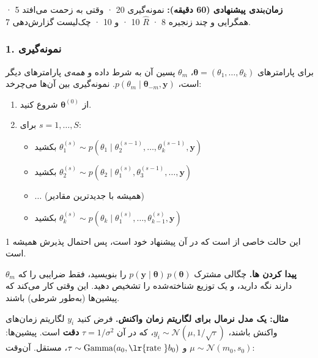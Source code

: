 \textbf{زمان‌بندی پیشنهادی (60 دقیقه):} نمونه‌گیری  20 · وقتی
 به زحمت می‌افتد 5 · همگرایی و چند زنجیره 8 · \(\hat R\) 10 ·
 و  10 · چک‌لیست گزارش‌دهی 7.

\subsubsection{\texorpdfstring{1. نمونه‌گیری
}{1. نمونه‌گیری Gibbs}}

برای پارامترهای \(\boldsymbol\theta = (\theta_1,\allowbreak \dots,\allowbreak \theta_k)\)،
\textbf{} \(\theta_m\) پسین آن به شرط داده و
\emph{همه‌ی} پارامترهای دیگر است،
\(p(\theta_m \mid \boldsymbol\theta_{-m},\allowbreak \mathbf{y})\). نمونه‌گیری
 بین آن‌ها می‌چرخد:

\begin{enumerate}
\def\labelenumi{\arabic{enumi}.}
\tightlist
\item
  از \(\boldsymbol\theta^{(0)}\) شروع کنید.
\item
  برای \(s = 1, \dots, S\):

  \begin{itemize}
  \tightlist
  \item
    بکشید
    \(\theta_1^{(s)} \sim p(\theta_1 \mid \theta_2^{(s-1)},\allowbreak \dots,\allowbreak \theta_k^{(s-1)},\allowbreak \mathbf{y})\)
  \item
    بکشید
    \(\theta_2^{(s)} \sim p(\theta_2 \mid \theta_1^{(s)},\allowbreak \theta_3^{(s-1)},\allowbreak \dots,\allowbreak \mathbf{y})\)
  \item
    \ensuremath{\ldots} (همیشه با جدیدترین مقادیر)
  \item
    بکشید
    \(\theta_k^{(s)} \sim p(\theta_k \mid \theta_1^{(s)},\allowbreak \dots,\allowbreak \theta_{k-1}^{(s)},\allowbreak \mathbf{y})\)
  \end{itemize}
\end{enumerate}

این حالت خاصی از  است که در آن پیشنهاد خود
 است، پس احتمال پذیرش همیشه 1 است.

\textbf{پیدا کردن ها.} چگالی مشترک
\(p(\mathbf{y}\mid\boldsymbol\theta)\,p(\boldsymbol\theta)\) را بنویسید،
فقط ضرایبی را که \(\theta_m\) دارند نگه دارید، و یک توزیع شناخته‌شده را
تشخیص دهید. این وقتی کار می‌کند که پیشین‌ها (به‌طور شرطی)
\textbf{} باشند.

\textbf{مثال: یک مدل نرمال برای لگاریتم زمان واکنش.} فرض کنید \(y_i\)
لگاریتم زمان‌های واکنش باشند،
\(y_i \sim \mathcal{N}(\mu,\allowbreak 1/\sqrt{\tau})\)، که در آن
\(\tau = 1/\sigma^2\) \textbf{دقت}  است. پیشین‌ها:
\(\mu \sim \mathcal{N}(m_0, s_0)\) و
\(\tau \sim \mathrm{Gamma}(a_0, \text{\lr{rate }} b_0)\)، مستقل. آن‌وقت:

